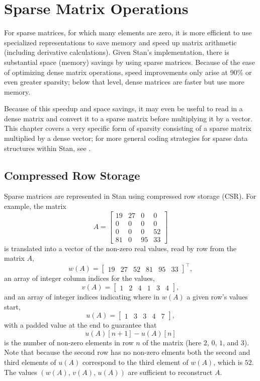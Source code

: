 \chapter{Sparse Matrix Operations}\label{sparse-matrices.chapter}

\noindent
For sparse matrices, for which many elements are zero, it is more
efficient to use specialized representations to save memory and speed
up matrix arithmetic (including derivative calculations).  Given
Stan's implementation, there is substantial space (memory) savings by
using sparse matrices.  Because of the ease of optimizing dense matrix
operations, speed improvements only arise at 90\% or even greater
sparsity; below that level, dense matrices are faster but use more memory.  

Because of this speedup and space savings, it may even be useful to
read in a dense matrix and convert it to a sparse matrix before
multiplying it by a vector.  This chapter covers a very specific form
of sparsity consisting of a sparse matrix multiplied by a dense
vector; for more general coding strategies for sparse data structures
within Stan, see .

\section{Compressed Row Storage}\label{CSR.section}

Sparse matrices are represented in Stan using compressed row storage
(CSR).  For example, the matrix
\[
A = 
\begin{bmatrix}
19 & 27 & 0 & 0 
\\ 
0 & 0 & 0 & 0 
\\
0 & 0 & 0 & 52
\\
81 & 0 & 95 & 33
\end{bmatrix}
\]
is translated into a vector of the non-zero real values, read by row
from the matrix $A$,
\[
w(A) =
\begin{bmatrix}
19 & 27 & 52 & 81 & 95 & 33
\end{bmatrix}^{\top} \! \! \! ,
\]
an array of integer column indices for the values,
\[
v(A) = 
\begin{bmatrix}
1 & 2 & 4 & 1 & 3 & 4
\end{bmatrix} \! ,
\]
and an array of integer indices indicating where in $w(A)$ a given row's
values start,
\[
u(A) = 
\begin{bmatrix}
1 & 3 & 3 & 4 & 7
\end{bmatrix} \! ,
\]
with a padded value at the end to guarantee that 
\[
u(A)[n+1] - u(A)[n]
\]
is the number of non-zero elements in row $n$ of the matrix (here $2$, $0$,
$1$, and $3$). Note that because the second row has no non-zero elments both
the second and third elements of $u(A)$ correspond to the third element of
$w(A)$, which is $52$. The values $(w(A), \, v(A), \, u(A))$ are sufficient 
to reconstruct $A$.

